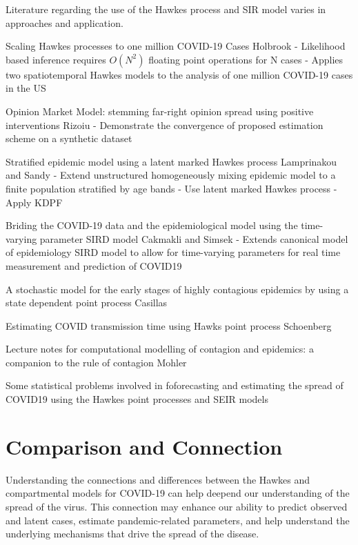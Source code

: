 \documentclass[12pt]{article}
\begin{document}
Literature regarding the use of the Hawkes process and SIR model varies in approaches and application. 










Scaling Hawkes processes to one million COVID-19 Cases
Holbrook
- Likelihood based inference requires $O(N^2)$ floating point operations for N cases
- Applies two spatiotemporal Hawkes models to the analysis of one million COVID-19 cases in the US


Opinion Market Model: stemming far-right opinion spread using positive interventions
Rizoiu
- Demonstrate the convergence of proposed estimation scheme on a synthetic dataset


Stratified epidemic model using a latent marked Hawkes process
Lamprinakou and Sandy
- Extend unstructured homogeneously mixing epidemic model to a finite population stratified by age bands
- Use latent marked Hawkes process
- Apply KDPF

Briding the COVID-19 data and the epidemiological model using the time-varying parameter SIRD model
Cakmakli and Simsek
- Extends canonical model of epidemiology SIRD model to allow for time-varying parameters for real time measurement and prediction of COVID19


A stochastic model for the early stages of highly contagious epidemics by using a state dependent point process
Casillas


Estimating COVID transmission time using Hawks point process
Schoenberg


Lecture notes for computational modelling of contagion and epidemics: a companion to the rule of contagion 
Mohler


Some statistical problems involved in foforecasting and estimating the spread of COVID19 using the Hawkes point processes and SEIR models






\section{Comparison and Connection}

Understanding the connections and differences between the Hawkes and compartmental models for COVID-19 can help deepend our understanding of the spread of the virus. This connection may enhance our ability to predict observed and latent cases, estimate pandemic-related parameters, and help understand the underlying mechanisms that drive the spread of the disease. 
\end{document}
